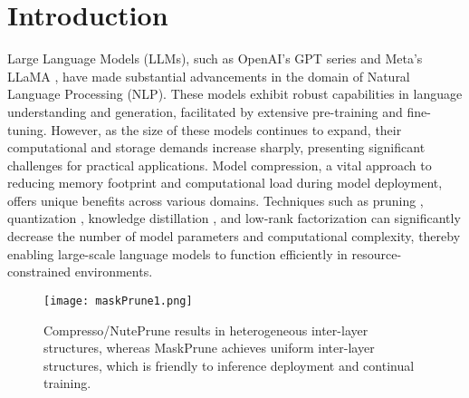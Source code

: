 

\section{Introduction}

Large Language Models (LLMs), such as OpenAI's GPT series \citep{achiam2023gpt} and Meta's LLaMA \citep{touvron2023llama, touvron2023llama2}, have made substantial advancements in the domain of Natural Language Processing (NLP). These models exhibit robust capabilities in language understanding and generation, facilitated by extensive pre-training and fine-tuning. However, as the size of these models continues to expand, their computational and storage demands increase sharply, presenting significant challenges for practical applications. Model compression, a vital approach to reducing memory footprint and computational load during model deployment, offers unique benefits across various domains. Techniques such as pruning \citep{frantar2023sparsegpt, ma2023llm, sun2023wanda}, quantization \citep{frantar2023gptq, xiao2023smoothquant, lin2024awq}, knowledge distillation \citep{gu2024minillm, agarwal2023gkd}, and low-rank factorization \citep{yuan2023asvd, wang2024svd} can significantly decrease the number of model parameters and computational complexity, thereby enabling large-scale language models to function efficiently in resource-constrained environments.

\begin{figure}
    \centering
    \texttt{[image: maskPrune1.png]}
    \caption{Compresso/NutePrune results in heterogeneous inter-layer structures, whereas MaskPrune achieves uniform inter-layer structures, which is friendly to inference deployment and continual training.}
    \label{fig:MaskPrune1}
\end{figure}

